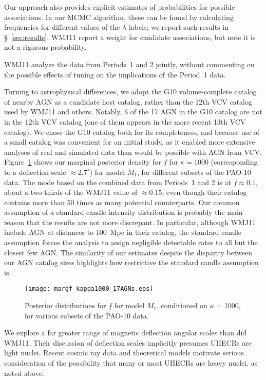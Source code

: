 Our approach also provides explicit estimates of probabilities for possible
associations.  In our MCMC algorithm, these can be found by calculating
frequencies for different values of the $\lambda$ labels; we report
such results in \S~\ref{sec:results}.  WMJ11 report a weight for
candidate associations, but note it is not a rigorous probability.

WMJ11 analyze the data from Periods~1 and 2 jointly, without commenting on the
possible effects of tuning on the implications of the Period~1 data.

Turning to astrophysical differences, we adopt the G10 volume-complete catalog
of nearby AGN as a candidate host catalog, rather than the 12th VCV catalog
used by WMJ11 and others.  Notably, 6 of the 17 AGN in the G10 catalog are not
in the 12th VCV catalog (one of them appears in the more recent 13th VCV
catalog).  We chose the G10 catalog both for its completeness, and because use
of a small catalog was convenient for an initial study, as it enabled more
extensive analyses of real and simulated data than would be possible with AGN
from VCV. Figure~\ref{fig:f1000} shows our marginal posterior density for $f$
for $\kappa = 1000$ (corresponding to a deflection scale $\approx 2.7^\circ$)
for model $M_1$, for different subsets of the PAO-10 data. The mode based on
the combined data from Periods~1 and 2 is at $f \approx 0.1$, about a
two-thirds of the WMJ11 value of $\approx 0.15$, even though their catalog
contains more than 50 times as many potential counterparts.  Our common
assumption of a standard candle intensity distribution is probably the main
reason that the results are not more discrepant. In particular, although WMJ11
include AGN at distances to 100~Mpc in their catalog, the standard candle
assumption forces the analysis to assign negligible detectable rates to all
but the closest few AGN.  The similarity of our estimates despite the
disparity between our AGN catalog sizes highlights how restrictive the
standard candle assumption is.

\begin{figure}
\centerline{\texttt{[image: margf\_kappa1000\_17AGNs.eps]}}
\caption{Posterior distributions for $f$ for model $M_1$, conditioned on
$\kappa$ = 1000, for various subsets of the PAO-10 data.}
\label{fig:f1000}
\end{figure}

We explore a far greater range of magnetic deflection angular scales
than did WMJ11.  Their discussion of deflection scales implicitly
presumes UHECRs are light nuclei.  Recent cosmic ray data and
theoretical models motivate serious consideration of the possibility
that many or most UHECRs are heavy nuclei, as noted above.


